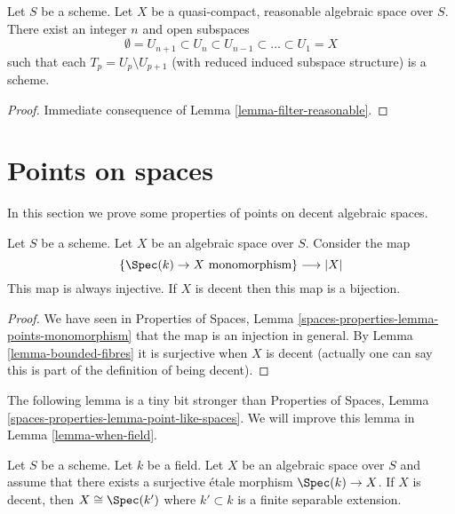 \begin{lemma}
\label{lemma-stratify-reasonable}
Let $S$ be a scheme. Let $X$ be a quasi-compact, reasonable algebraic space
over $S$. There exist an integer $n$ and open subspaces
$$
\emptyset = U_{n + 1} \subset
U_n \subset U_{n - 1} \subset \ldots \subset U_1 = X
$$
such that each $T_p = U_p \setminus U_{p + 1}$ (with reduced induced subspace
structure) is a scheme.
\end{lemma}

\begin{proof}
Immediate consequence of Lemma \ref{lemma-filter-reasonable}.
\end{proof}
















\section{Points on spaces}
\label{section-points}

\noindent
In this section we prove some properties of points on decent algebraic spaces.

\begin{lemma}
\label{lemma-decent-points-monomorphism}
Let $S$ be a scheme. Let $X$ be an algebraic space over $S$.
Consider the map
$$
\{\Spec(k) \to X \text{ monomorphism}\}
\longrightarrow
|X|
$$
This map is always injective. If $X$ is decent then this map
is a bijection.
\end{lemma}

\begin{proof}
We have seen in
Properties of Spaces,
Lemma \ref{spaces-properties-lemma-points-monomorphism}
that the map is an injection in general.
By Lemma \ref{lemma-bounded-fibres} it is surjective when $X$ is
decent (actually one can say this is part of the definition
of being decent).
\end{proof}

\noindent
The following lemma is a tiny bit stronger than
Properties of Spaces,
Lemma \ref{spaces-properties-lemma-point-like-spaces}.
We will improve this lemma in Lemma \ref{lemma-when-field}.

\begin{lemma}
\label{lemma-decent-point-like-spaces}
Let $S$ be a scheme. Let $k$ be a field. Let $X$ be an algebraic space
over $S$ and assume that there exists a surjective \'etale morphism
$\Spec(k) \to X$. If $X$ is decent, then $X \cong \Spec(k')$
where $k' \subset k$ is a finite separable extension.
\end{lemma}

